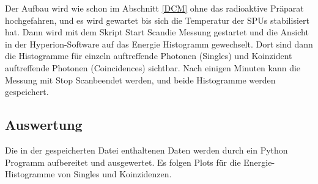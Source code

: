 \documentclass[12pt,twoside,a4paper]{scrartcl}
\begin{document}
		Der Aufbau wird wie schon im Abschnitt \ref{DCM} ohne das radioaktive Präparat hochgefahren, und es wird gewartet bis sich die Temperatur der SPUs stabilisiert hat.
		Dann wird mit dem Skript \glqq Start Scan\grqq die Messung gestartet und die Ansicht in der Hyperion-Software auf das Energie Histogramm gewechselt. Dort sind dann die Histogramme für einzeln auftreffende Photonen (Singles) und Koinzident auftreffende Photonen (Coincidences) sichtbar. Nach einigen Minuten kann die Messung mit \glqq Stop Scan\grqq beendet werden, und beide Histogramme werden gespeichert.

		\subsection{Auswertung}

		Die in der gespeicherten Datei enthaltenen Daten werden durch ein Python Programm aufbereitet und ausgewertet.
		Es folgen Plots für die Energie-Histogramme von Singles und Koinzidenzen.
\end{document}
